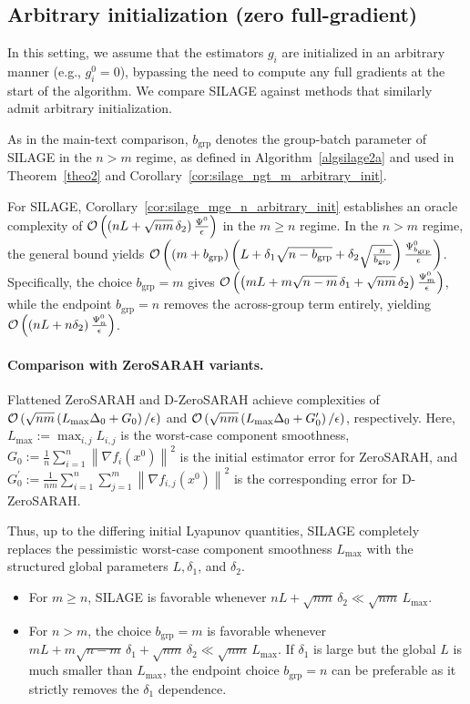\documentclass{article}
\newcommand{\sqn}[1]{\left\| #1 \right\|^2}
\newcommand{\cO}{{\cal O}}
\newcommand{\eqdef}{:=}
\newcommand{\rb}[1]{\left(#1\right)}
\theoremstyle{plain}
\newcommand{\algname}[1]{{\sf\scalefont{0.88}\color{mydarkgreen}#1}\xspace}
\newcommand{\algno}{{\sf\scalefont{0.88}\color{mydarkgreen}SILAGE}\xspace}
\def\algname#1{#1}%
\begin{document}
\subsection{Arbitrary initialization (zero full-gradient)}
\label{sec:app-comparison-baselines-arbitrary-init}

In this setting, we assume that the estimators $g_i$ are initialized in an arbitrary manner (e.g., $g_i^0 = 0$), bypassing the need to compute any full gradients at the start of the algorithm. We compare \algno against methods that similarly admit arbitrary initialization.

As in the main-text comparison, $b_{\mathrm{grp}}$ denotes the group-batch parameter of \algname{SILAGE} in the $n>m$ regime, as defined in Algorithm~\ref{algsilage2a} and used in Theorem~\ref{theo2} and Corollary~\ref{cor:silage_ngt_m_arbitrary_init}.

For \algno, Corollary~\ref{cor:silage_mge_n_arbitrary_init} establishes an oracle complexity of $\cO\rb{\rb{nL+\sqrt{nm}\,\delta_2}\frac{\Psi^0}{\epsilon}}$ in the $m\ge n$ regime. In the $n>m$ regime, the general bound yields $\cO\rb{\rb{m+b_{\mathrm{grp}}}\rb{L+\delta_1\sqrt{n-b_{\mathrm{grp}}}+\delta_2\sqrt{\tfrac{n}{b_{\mathrm{grp}}}}}\frac{\Psi_{b_{\mathrm{grp}}}^0}{\epsilon}}$. Specifically, the choice $b_{\mathrm{grp}}=m$ gives $\cO\rb{\rb{mL+m\sqrt{n-m}\,\delta_1+\sqrt{nm}\,\delta_2}\frac{\Psi_m^0}{\epsilon}}$, while the endpoint $b_{\mathrm{grp}}=n$ removes the across-group term entirely, yielding $\cO\rb{\rb{nL+n\delta_2}\frac{\Psi_n^0}{\epsilon}}$.

\paragraph{Comparison with \algname{ZeroSARAH} variants.}
Flattened \algname{ZeroSARAH} and \algname{D-ZeroSARAH} achieve complexities of $\cO\rb{\sqrt{nm}\rb{L_{\max}\Delta_0+G_0}/\epsilon}$ and $\cO\rb{\sqrt{nm}\rb{L_{\max}\Delta_0+G'_0}/\epsilon}$, respectively. Here, $L_{\max}\eqdef \max_{i,j}L_{i,j}$ is the worst-case component smoothness, $G_0 \eqdef \frac{1}{n} \sum_{i=1}^n\sqn{\nabla f_i(x^0)}$ is the initial estimator error for \algname{ZeroSARAH}, and $G_0^{\prime} \eqdef \frac{1}{nm} \sum_{i=1}^n \sum_{j=1}^m\sqn{\nabla f_{i,j}(x^0)}$ is the corresponding error for \algname{D-ZeroSARAH}.

Thus, up to the differing initial Lyapunov quantities, \algno completely replaces the pessimistic worst-case component smoothness $L_{\max}$ with the structured global parameters $L, \delta_1$, and $\delta_2$. 
\begin{itemize}[leftmargin=*]
    \item For $m\ge n$, \algno is favorable whenever $nL+\sqrt{nm}\,\delta_2 \ll \sqrt{nm}\,L_{\max}$.
    \item For $n>m$, the choice $b_{\mathrm{grp}}=m$ is favorable whenever $mL+m\sqrt{n-m}\,\delta_1+\sqrt{nm}\,\delta_2 \ll \sqrt{nm}\,L_{\max}$. If $\delta_1$ is large but the global $L$ is much smaller than $L_{\max}$, the endpoint choice $b_{\mathrm{grp}}=n$ can be preferable as it strictly removes the $\delta_1$ dependence.
\end{itemize}
\end{document}

